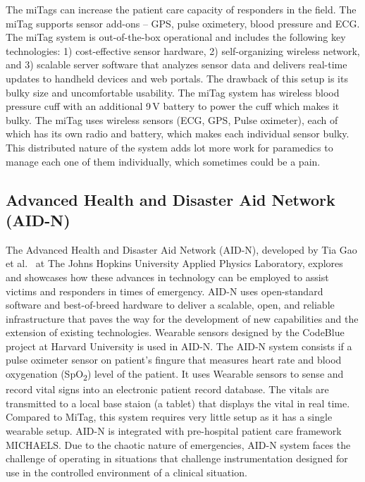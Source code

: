 The miTags can increase the patient care capacity of responders in
the field. The miTag supports sensor add-ons -- GPS, pulse oximetery,
blood pressure and ECG.  The miTag system is out-of-the-box
operational and includes the following key technologies: 1)
cost-effective sensor hardware, 2) self-organizing wireless network,
and 3) scalable server software that analyzes sensor data and
delivers real-time updates to handheld devices and web portals. The
drawback of this setup is its bulky size and uncomfortable usability.
The miTag system has wireless blood pressure cuff with an additional
9\,V battery to power the cuff which makes it bulky. The miTag uses
wireless sensors (ECG, GPS, Pulse oximeter), each of which has its
own radio and battery, which makes each individual sensor bulky. This
distributed nature of the system adds lot more work for paramedics to
manage each one of them individually, which sometimes could be a
pain. 

\subsection{Advanced Health
	and Disaster Aid Network (AID-N)}

The Advanced Health and Disaster Aid Network (AID-N), developed by
Tia Gao et al.~\cite{AID-N} at The Johns Hopkins University Applied
Physics Laboratory, explores and showcases how these advances in
technology can be employed to assist victims and responders in times
of emergency. AID-N uses open-standard software and best-of-breed
hardware to deliver a scalable, open, and reliable infrastructure
that paves the way for the development of new capabilities and the
extension of existing technologies.  Wearable sensors designed by the
CodeBlue project at Harvard University is used in AID-N. The AID-N
system consists if a pulse oximeter sensor on patient's fingure that
measures heart rate and blood oxygenation (SpO\textsubscript{2})
level of the patient. It uses Wearable sensors to sense and record
vital signs into an electronic patient record database. The vitals
are transmitted to a local base staion (a tablet) that displays the
vital in real time. Compared to MiTag, this system requires very
little setup as it has a single wearable setup. AID-N is integrated
with pre-hospital patient care framework MICHAELS. Due to the chaotic
nature of emergencies, AID-N system faces the challenge of operating
in situations that challenge instrumentation designed for use in the
controlled environment of a clinical situation. 


